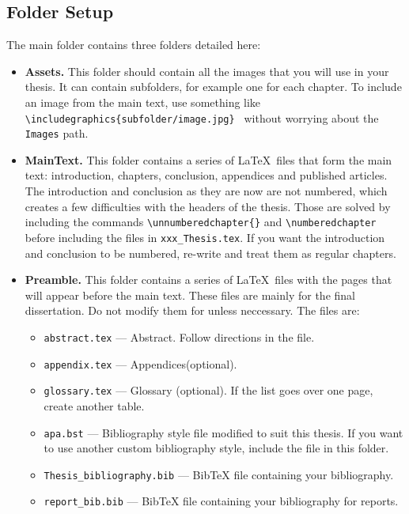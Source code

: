 \subsection{Folder Setup}
The main folder contains three folders detailed here:
\begin{itemize}

    \item \textbf{Assets.} This folder should contain all the images that you will use in your thesis. It can contain subfolders, for example one for each chapter. To include an image from the main text, use something like \texttt{\textbackslash includegraphics\{subfolder/image.jpg\} } without worrying about the \texttt{Images} path.

    \item \textbf{MainText.} This folder contains a series of \LaTeX\ files that form the main text: introduction, chapters, conclusion, appendices and published articles. The introduction and conclusion as they are now are not numbered, which creates a few difficulties with the headers of the thesis. Those are solved by including the commands \texttt{\textbackslash unnumberedchapter\{\}} and \texttt{\textbackslash numberedchapter} before including the files in \texttt{xxx\_Thesis.tex}. If you want the introduction and conclusion to be numbered, re-write and treat them as regular chapters.

    \item \textbf{Preamble.} This folder contains a series of \LaTeX\ files with the pages that will appear before the main text. These files are mainly for the final dissertation. Do not modify them for unless neccessary. The files are:
    \begin{itemize}
    \item \texttt{abstract.tex} --- Abstract. Follow directions in the file.
    \item \texttt{appendix.tex} --- Appendices(optional).
    \item \texttt{glossary.tex} --- Glossary (optional). If the list goes over one page, create another table.
    \item \texttt{apa.bst} --- Bibliography style file modified to suit this thesis. If you want to use another custom bibliography style, include the file in this folder.
    \item \texttt{Thesis\_bibliography.bib} --- BibTeX file containing your bibliography.
    \item \texttt{report\_bib.bib} --- BibTeX file containing your bibliography for reports.
    \end{itemize}

    \end{itemize}

